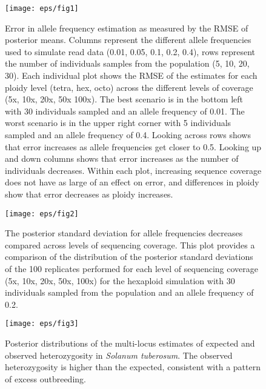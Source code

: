 \documentclass[11pt,english,letterpaper,oneside]{article}
\begin{document}
\begin{figure}
\centering
\caption{Error in allele frequency estimation as measured by the RMSE of posterior means. Columns represent the different allele frequencies used to simulate read data (0.01, 0.05, 0.1, 0.2, 0.4), rows represent the number of individuals samples from the population (5, 10, 20, 30). Each individual plot shows the RMSE of the estimates for each ploidy level (tetra, hex, octo) across the different levels of coverage (5x, 10x, 20x, 50x 100x). The best scenario is in the bottom left with 30 individuals sampled and an allele frequency of 0.01. The worst scenario is in the upper right corner with 5 individuals sampled and an allele frequency of 0.4. Looking across rows shows that error increases as allele frequencies get closer to 0.5. Looking up and down columns shows that error increases as the number of individuals decreases. Within each plot, increasing sequence coverage does not have as large of an effect on error, and differences in ploidy show that error decreases as ploidy increases.}
\vspace{0.25in}
\texttt{[image: eps/fig1]}
\label{fig1:rmse}
\end{figure}

\begin{figure}
\centering
\caption{The posterior standard deviation for allele frequencies decreases compared across levels of sequencing coverage. This plot provides a comparison of the distribution of the posterior standard deviations of the 100 replicates performed for each level of sequencing coverage (5x, 10x, 20x, 50x, 100x) for the hexaploid simulation with 30 individuals sampled from the population and an allele frequency of 0.2.}
\vspace{0.25in}
\texttt{[image: eps/fig2]}
\label{fig2:coverage-sd}
\end{figure}


\begin{figure}
\centering
\caption{Posterior distributions of the multi-locus estimates of expected and observed heterozygosity in \textit{Solanum tuberosum}. The observed heterozygosity is higher than the expected, consistent with a pattern of excess outbreeding.}
\vspace{0.25in}
\texttt{[image: eps/fig3]}
\label{fig3:het}
\end{figure}
\end{document}
